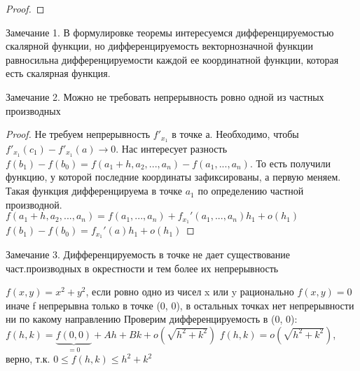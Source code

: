 \begin{theorem}
\begin{proof}
    \end{proof}

    \item Замечание 1. В формулировке теоремы интересуемся дифференцируемостью скалярной функции, но дифференцируемость векторнозначной функции равносильна дифференцируемости каждой ее координатной функции, которая есть скалярная функция.\newline
    \item Замечание 2. Можно не требовать непрерывность ровно одной из частных производных
	\begin{proof} \thmslashn

	Не требуем непрерывность $f'_{x_1}$ в точке а. Необходимо, чтобы $f'_{x_1}(c_1) - f'_{x_1}(a) \rightarrow 0$.\newline
	Нас интересует разность $f(b_1) - f(b_0) = f(a_1 + h, a_2, ..., a_n) - f(a_1, ..., a_n)$. То есть получили функцию, у которой последние координаты зафиксированы, а первую меняем. Такая функция дифференцируема в точке $a_1$ по определению частной производной.\newline
	$f(a_1 + h, a_2, ..., a_n) = f(a_1, ..., a_n) + f_{x_1}'(a_1, ..., a_n)h_1 + o(h_1)$\newline
	$f(b_1) - f(b_0) = f_{x_1}'(a)h_1 + o(h_1)$
	\end{proof}
    \item Замечание 3. Дифференцируемость в точке не дает существование част.производных в окрестности и тем более их непрерывность
	\begin{example} \thmslashn

	$f(x, y) = x^2 + y^2$, если ровно одно из чисел x или y рационально\newline
	$f(x, y) = 0$ иначе \newline 
	f непрерывна только в точке (0, 0), в остальных точках нет непрерывности ни по какому направлению\newline
	Проверим дифференцируемость в (0, 0): $f(h, k) = \underbrace{f(0, 0)}_{=0} + Ah + Bk + o(\sqrt{h^2 + k^2})$\newline
	$f(h, k) = o(\sqrt{h^2 + k^2})$, верно, т.к. $0 \leqslant f(h, k) \leqslant h^2 + k^2$
	\end{example}

\end{theorem}

